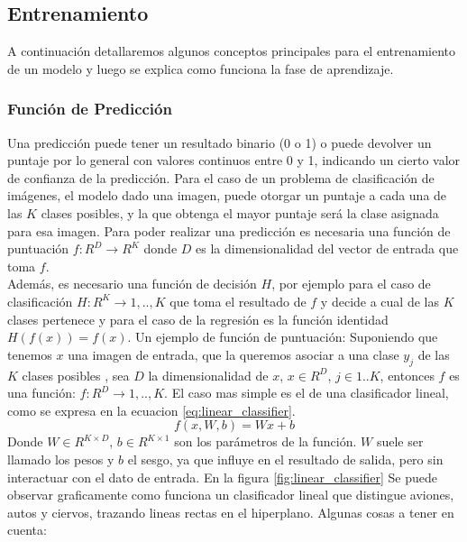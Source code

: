 \documentclass[a4paper,11pt,spanish]{book}
\begin{document}
      \subsection{Entrenamiento}
	A continuación detallaremos algunos conceptos principales para el entrenamiento de un modelo y luego se explica como funciona la fase de aprendizaje.
	\subsubsection{Función de Predicción \label{sec:prediccion}}
	  Una predicción puede tener un resultado binario (0 o 1) o puede devolver un puntaje por lo general con valores continuos entre 0 y 1, indicando un cierto valor de confianza
	  de la predicción. Para el caso de un problema de clasificación de imágenes, el modelo dado una imagen, puede otorgar un puntaje a cada una de las $K$ clases posibles,
	  y la que obtenga el mayor puntaje será la clase asignada para esa imagen. Para poder realizar una predicción es necesaria una función de puntuación $f:R^D {\rightarrow} R^K$
	  donde $D$ es la dimensionalidad del vector de entrada que toma $f$. \\
	  Además, es necesario una función de decisión $H$, por ejemplo para el caso de clasificación $H:R^K{\rightarrow}{1,..,K}$
	  que toma el resultado de $f$ y decide a cual de las $K$ clases pertenece y para el caso de la regresión es la función identidad $H(f(x))=f(x)$.
	  Un ejemplo de función de puntuación:
	  Suponiendo que tenemos $x$ una imagen de entrada, que la queremos asociar a una clase $y_{j}$ de las $K$ clases posibles , sea $D$ la dimensionalidad de $x$, $x \in R^D$,
	  $j \in 1..K$, entonces $f$ es una función: $f:R^D {\rightarrow} {1,..,K}$. El caso mas simple es el de una clasificador lineal, como se expresa en la ecuacion \eqref{eq:linear_classifier}.
	  \begin{equation}\label{eq:linear_classifier}
	    f(x, W, b) = W x + b
	  \end{equation}
	  Donde $W \in R^{K \times D}$, $b \in R^{K \times 1}$ son los parámetros de la función. $W$ suele ser llamado los pesos y $b$ el sesgo, ya que influye en el resultado de salida, pero sin
	  interactuar con el dato de entrada. En la figura \ref{fig:linear_classifier} Se puede observar graficamente como funciona un clasificador lineal que distingue aviones, autos y ciervos,
	  trazando lineas rectas en el hiperplano.
	  Algunas cosas a tener en cuenta:
\end{document}
